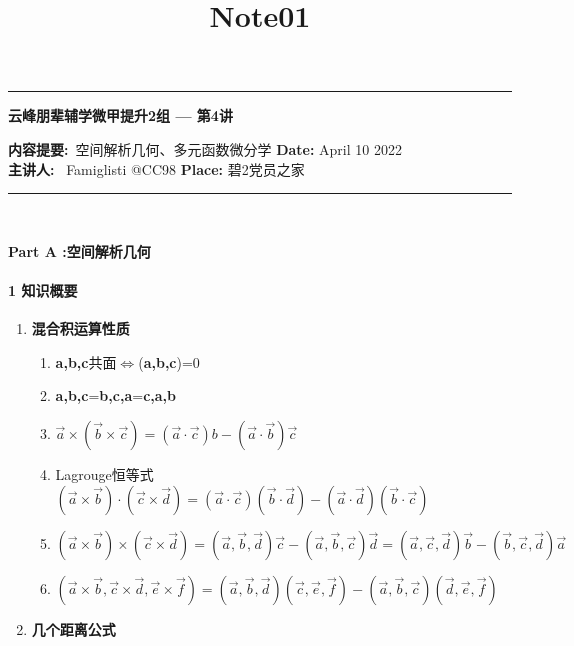 \documentclass[12pt]{scrartcl}
\title{Note01}
\begin{document}
\begin{center}
	\hrule
	\vspace{.4cm}
	{\textbf { \large 云峰朋辈辅学微甲提升2组 --- 第4讲}}
\end{center}
{\textbf{内容提要:}\ 空间解析几何、多元函数微分学 \hspace{\fill} \textbf{Date:} April 10 2022    \\
{ \textbf{主讲人:}} \ Famiglisti @CC98  \hspace{\fill} \textbf{Place:} 碧2党员之家 \\
	\hrule
~\\
\begin{center}
\textbf{\large{Part A :空间解析几何} }
\end{center}  
\paragraph*{\large 1 知识概要}
\begin{enumerate}
    \item  \textbf{混合积运算性质}
    \begin{enumerate}
        \item \textbf{a,b,c}共面$\Leftrightarrow $(\textbf{a,b,c})=0
        \item \textbf{a,b,c}=\textbf{b,c,a}=\textbf{c,a,b}
        \item $\vec{a}\times (\vec{b} \times \vec{c})= (\vec{a}\cdot \vec{c})b
        -(\vec{a}\cdot \vec{b})\vec{c}$
        \item Lagrouge恒等式$(\vec{a}\times \vec{b})\cdot (\vec{c}\times \vec{d})= 
        (\vec{a}\cdot \vec{c})(\vec{b}\cdot \vec{d})-
        (\vec{a}\cdot \vec{d})(\vec{b}\cdot \vec{c})$
        \item $(\vec{a}\times \vec{b})\times (\vec{c}\times \vec{d})=
         (\vec{a},\vec{b},\vec{d})\vec{c}- 
         (\vec{a},\vec{b},\vec{c})\vec{d}=
         (\vec{a},\vec{c},\vec{d})\vec{b}-
         (\vec{b},\vec{c},\vec{d})\vec{a}
        $
        \item $
        (\vec{a}\times \vec{b},\vec{c}\times \vec{d},\vec{e}\times \vec{f})
        = (\vec{a},\vec{b},\vec{d}) (\vec{c},\vec{e},\vec{f})-
        (\vec{a},\vec{b},\vec{c}) (\vec{d},\vec{e},\vec{f})
        $
    \end{enumerate}\leavevmode \newline
    \item  \textbf{几个距离公式}
\end{enumerate}}
\end{document}
